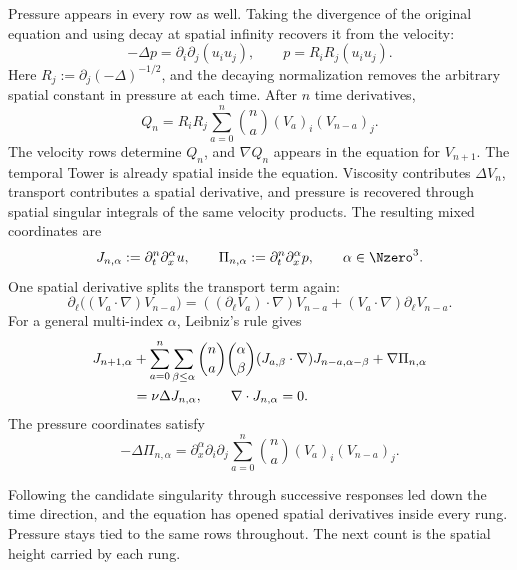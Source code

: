 Pressure appears in every row as well.
Taking the divergence of the original equation and using decay at spatial infinity recovers it from the velocity:
\begin{equation}\label{eq:PressureNormalization}
  -\Delta p=\partial_i\partial_j(u_i u_j),
  \qquad
  p=R_iR_j(u_i u_j).
\end{equation}
Here \(R_j:=\partial_j(-\Delta)^{-1/2}\), and the decaying normalization removes the arbitrary spatial constant in pressure at each time.
After \(n\) time derivatives,
\begin{equation}\label{eq:BodyTemporalPressureRecurrence}
  Q_n
  =R_iR_j
  \sum_{a=0}^{n}\binom{n}{a}
  (V_a)_i(V_{n-a})_j.
\end{equation}
The velocity rows determine \(Q_n\), and \(\nabla Q_n\) appears in the equation for \(V_{n+1}\).
The temporal Tower is already spatial inside the equation.
Viscosity contributes \(\Delta V_n\), transport contributes a spatial derivative, and pressure is recovered through spatial singular integrals of the same velocity products.
The resulting mixed coordinates are
\begin{equation}\label{eq:BodyMixedJetDefinition}
  J_{n,\alpha}:=\partial_t^n\partial_x^\alpha u,
  \qquad
  \Pi_{n,\alpha}:=\partial_t^n\partial_x^\alpha p,
  \qquad
  \alpha\in\Nzero^3.
\end{equation}
One spatial derivative splits the transport term again:
\[
  \partial_\ell\bigl((V_a\cdot\nabla)V_{n-a}\bigr)
  =((\partial_\ell V_a)\cdot\nabla)V_{n-a}
  +(V_a\cdot\nabla)\partial_\ell V_{n-a}.
\]
For a general multi-index \(\alpha\), Leibniz's rule gives
\begin{align}
  J_{n+1,\alpha}
  &+
  \sum_{a=0}^{n}
  \sum_{\beta\leq\alpha}
  \binom{n}{a}\binom{\alpha}{\beta}
  (J_{a,\beta}\cdot\nabla)
  J_{n-a,\alpha-\beta}
  +\nabla\Pi_{n,\alpha}
  \notag\\
  &=
  \nu\Delta J_{n,\alpha},
  \qquad
  \nabla\cdot J_{n,\alpha}=0.
  \label{eq:BodyMixedJetRecurrence}
\end{align}
The pressure coordinates satisfy
\begin{equation}\label{eq:BodyMixedPressureRecurrence}
  -\Delta\Pi_{n,\alpha}
  =
  \partial_x^\alpha\partial_i\partial_j
  \sum_{a=0}^{n}\binom{n}{a}
  (V_a)_i(V_{n-a})_j.
\end{equation}

Following the candidate singularity through successive responses led down the time direction, and the equation has opened spatial derivatives inside every rung.
Pressure stays tied to the same rows throughout.
The next count is the spatial height carried by each rung.
